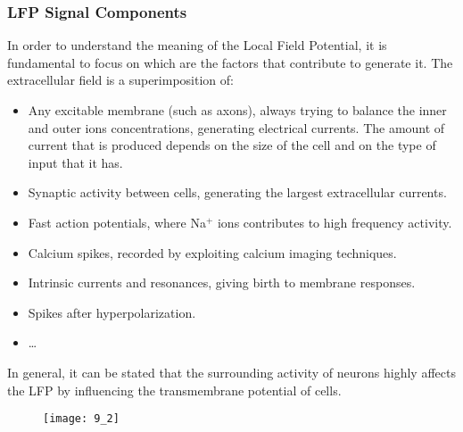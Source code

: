 \subsubsection{LFP Signal Components}
In order to understand the meaning of the Local Field Potential, it is fundamental to
focus on which are the factors that contribute to generate it. The extracellular
field is a superimposition of:
\begin{itemize}
    \item Any excitable membrane (such as axons), always trying to balance the inner
          and outer ions concentrations, generating electrical currents. The amount
          of current that is produced depends on the size of the cell and on the type
          of input that it has.
    \item Synaptic activity between cells, generating the largest extracellular
          currents.
    \item Fast action potentials, where Na\({}^+\) ions contributes to high frequency
          activity.
    \item Calcium spikes, recorded by exploiting calcium imaging techniques.
    \item Intrinsic currents and resonances, giving birth to membrane responses.
    \item Spikes after hyperpolarization.
    \item \dots
\end{itemize}
In general, it can be stated that the surrounding activity of neurons highly affects
the LFP by influencing the transmembrane potential of cells.
\begin{figure}[H]
    \texttt{[image: 9\_2]}
    \centering
\end{figure}
